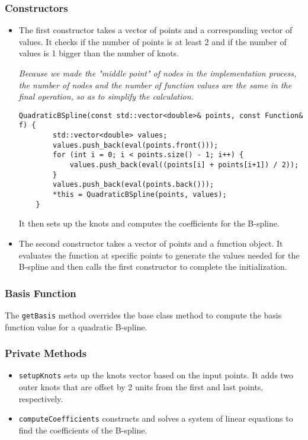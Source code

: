 \documentclass{article}
\begin{document}
\subsubsection{Constructors}
\begin{itemize}
    \item The first constructor takes a vector of points and a corresponding vector of values. It checks if the number of points is at least 2 and if the number of values is 1 bigger than the number of knots.\par
    \emph{Because we made the "middle point" of nodes in the implementation process, the number of nodes and the number of function values are the same in the final operation, so as to simplify the calculation.}
    \begin{lstlisting}[caption={}]
    QuadraticBSpline(const std::vector<double>& points, const Function& f) {
        std::vector<double> values;
        values.push_back(eval(points.front()));
        for (int i = 0; i < points.size() - 1; i++) {
            values.push_back(eval((points[i] + points[i+1]) / 2));
        }
        values.push_back(eval(points.back()));
        *this = QuadraticBSpline(points, values);
    }
    \end{lstlisting}
    It then sets up the knots and computes the coefficients for the B-spline.
    \item The second constructor takes a vector of points and a function object. It evaluates the function at specific points to generate the values needed for the B-spline and then calls the first constructor to complete the initialization.
\end{itemize}

\subsubsection{Basis Function}
The \texttt{getBasis} method overrides the base class method to compute the basis function value for a quadratic B-spline.

\subsubsection{Private Methods}
\begin{itemize}
    \item \texttt{setupKnots} sets up the knots vector based on the input points. It adds two outer knots that are offset by 2 units from the first and last points, respectively.
    \item \texttt{computeCoefficients} constructs and solves a system of linear equations to find the coefficients of the B-spline.
\end{itemize}
\end{document}
